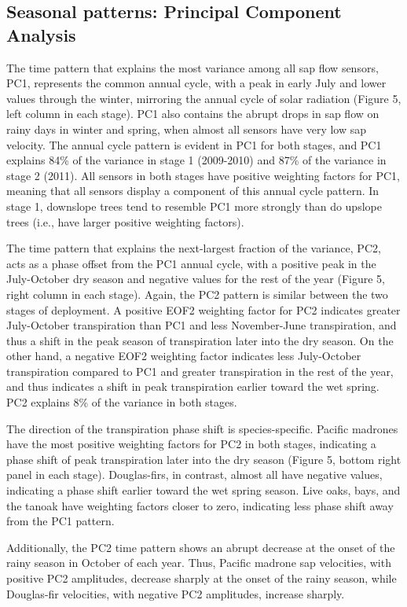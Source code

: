 \subsection{Seasonal patterns: Principal Component Analysis}
The time pattern that explains the most variance among all sap flow sensors, PC1, represents the common annual cycle, with a peak in early July and lower values through the winter, mirroring the annual cycle of solar radiation (Figure 5, left column in each stage).  PC1 also contains the abrupt drops in sap flow on rainy days in winter and spring, when almost all sensors have very low sap velocity.  The annual cycle pattern is evident in PC1 for both stages, and PC1 explains 84\% of the variance in stage 1 (2009-2010) and 87\% of the variance in stage 2 (2011).  All sensors in both stages have positive weighting factors for PC1, meaning that all sensors display a component of this annual cycle pattern.  In stage 1, downslope trees tend to resemble PC1 more strongly than do upslope trees (i.e., have larger positive weighting factors).

The time pattern that explains the next-largest fraction of the variance, PC2, acts as a phase offset from the PC1 annual cycle, with a positive peak in the July-October dry season and negative values for the rest of the year (Figure 5, right column in each stage).  Again, the PC2 pattern is similar between the two stages of deployment.  A positive EOF2 weighting factor for PC2 indicates greater July-October transpiration than PC1 and less November-June transpiration, and thus a shift in the peak season of transpiration later into the dry season.  On the other hand, a negative EOF2 weighting factor indicates less July-October transpiration compared to PC1 and greater transpiration in the rest of the year, and thus indicates a shift in peak transpiration earlier toward the wet spring.  PC2 explains 8\% of the variance in both stages.

The direction of the transpiration phase shift is species-specific.  Pacific madrones have the most positive weighting factors for PC2 in both stages, indicating a phase shift of peak transpiration later into the dry season (Figure 5, bottom right panel in each stage).  Douglas-firs, in contrast, almost all have negative values, indicating a phase shift earlier toward the wet spring season.  Live oaks, bays, and the tanoak have weighting factors closer to zero, indicating less phase shift away from the PC1 pattern.

Additionally, the PC2 time pattern shows an abrupt decrease at the onset of the rainy season in October of each year.  Thus, Pacific madrone sap velocities, with positive PC2 amplitudes, decrease sharply at the onset of the rainy season, while Douglas-fir velocities, with negative PC2 amplitudes, increase sharply.

